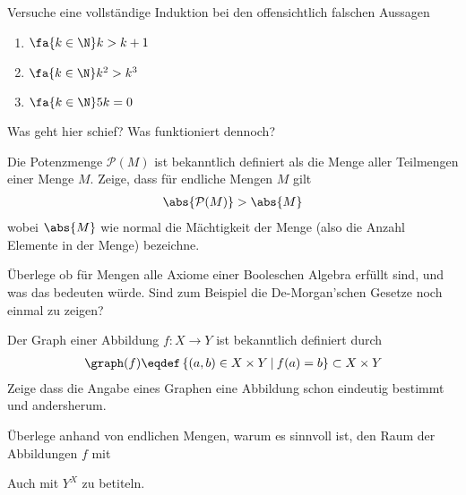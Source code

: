 \begin{exercise}
  Versuche eine vollständige Induktion bei den offensichtlich falschen Aussagen
  \begin{enumerate}
  \item $\fa{k \in \N} k > k + 1$
  \item $\fa{k \in \N} k^2 > k^3$
  \item $\fa{k \in \N} 5k = 0$
  \end{enumerate}
  Was geht hier schief? Was funktioniert dennoch?
\end{exercise}

\begin{exercise}
  Die Potenzmenge $\mathcal{P}(M)$ ist bekanntlich definiert als die Menge aller
  Teilmengen einer Menge $M$. Zeige, dass für endliche Mengen $M$ gilt
  \begin{equation*}
    \begin{split}
      \abs{ \mathcal{P}(M) } > \abs{ M }
    \end{split}
  \end{equation*}
  wobei $\abs{ M }$ wie normal die Mächtigkeit der Menge (also die Anzahl
  Elemente in der Menge) bezeichne.
\end{exercise}

\begin{exercise}
  Überlege ob für Mengen alle Axiome einer Booleschen Algebra erfüllt
  sind, und was das bedeuten würde. Sind zum Beispiel die De-Morgan'schen
  Gesetze noch einmal zu zeigen?
\end{exercise}

\begin{exercise}
  \label{ex:graph-of-map}
  Der Graph einer Abbildung $f\colon X \rightarrow Y$ ist bekanntlich definiert
  durch
  \begin{equation*}
    \begin{split}
      \graph(f) \eqdef \left\{ (a,b) \in X\times Y \:\arrowvert\:
        f(a)=b\right\} \subset X\times Y
    \end{split}
  \end{equation*}
  Zeige dass die Angabe eines Graphen eine Abbildung schon eindeutig bestimmt
  und andersherum.
\end{exercise}

\begin{exercise}
  Überlege anhand von endlichen Mengen, warum es sinnvoll ist, den Raum der
  Abbildungen $f$ mit
  \begin{center}
  \end{center}
  Auch mit $Y^X$ zu betiteln.
\end{exercise}

